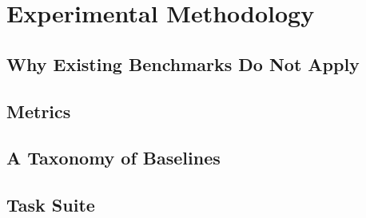 \chapter{Experimental Methodology}
\label{ch:methodology}

\section{Why Existing Benchmarks Do Not Apply}
\label{sec:meth-gap}

\section{Metrics}
\label{sec:meth-metrics}

\section{A Taxonomy of Baselines}
\label{sec:meth-baselines}

\section{Task Suite}
\label{sec:meth-tasks}

